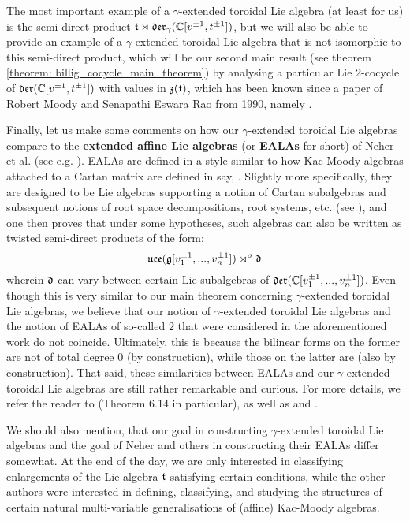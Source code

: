         The most important example of a $\gamma$-extended toroidal Lie algebra (at least for us) is the semi-direct product $\mathfrak{t} \rtimes \mathfrak{der}_{\gamma}(\mathbb{C}[v^{\pm 1}, t^{\pm 1}])$, but we will also be able to provide an example of a $\gamma$-extended toroidal Lie algebra that is not isomorphic to this semi-direct product, which will be our second main result (see theorem \ref{theorem: billig_cocycle_main_theorem}) by analysing a particular Lie $2$-cocycle of $\mathfrak{der}(\mathbb{C}[v^{\pm 1}, t^{\pm 1}])$ with values in $\mathfrak{z}(\mathfrak{t})$, which has been known since a paper of Robert Moody and Senapathi Eswara Rao from 1990, namely \cite{moody_rao_n_toroidal_vertex_representations}.

        Finally, let us make some comments on how our $\gamma$-extended toroidal Lie algebras compare to the \textbf{extended affine Lie algebras} (or \textbf{EALAs} for short) of Neher et al. (see e.g. \cite{neher_lectures_on_EALAs}). EALAs are defined in a style similar to how Kac-Moody algebras attached to a Cartan matrix are defined in say, \cite[Chapters 1 and 2]{kac_infinite_dimensional_lie_algebras}. Slightly more specifically, they are designed to be Lie algebras supporting a notion of Cartan subalgebras and subsequent notions of root space decompositions, root systems, etc. (see \cite[Subsection 2.1]{neher_lectures_on_EALAs}), and one then proves that under some hypotheses, such algebras can also be written as twisted semi-direct products of the form:
            $$\mathfrak{uce}( \mathfrak{g}[v_1^{\pm 1}, ..., v_n^{\pm 1}] ) \rtimes^{\sigma} \mathfrak{d}$$
        wherein $\mathfrak{d}$ can vary between certain Lie subalgebras of $\mathfrak{der}(\mathbb{C}[v_1^{\pm 1}, ..., v_n^{\pm 1}])$. Even though this is very similar to our main theorem concerning $\gamma$-extended toroidal Lie algebras, we believe that our notion of $\gamma$-extended toroidal Lie algebras and the notion of EALAs of so-called  $2$ that were considered in the aforementioned work do not coincide. Ultimately, this is because the bilinear forms on the former are not of total degree $0$ (by construction), while those on the latter are (also by construction). That said, these similarities between EALAs and our $\gamma$-extended toroidal Lie algebras are still rather remarkable and curious. For more details, we refer the reader to \cite[Subsections 6.11, 6.13, and 6.14]{neher_EALA_survey} (Theorem 6.14 in particular), as well as \cite{neher_structure_theory_of_EALAs} and \cite{allison_berman_faulkner_pianzola_multiloop_realisation_of_EALAs}.
        
        We should also mention, that our goal in constructing $\gamma$-extended toroidal Lie algebras and the goal of Neher and others in constructing their EALAs differ somewhat. At the end of the day, we are only interested in classifying enlargements of the Lie algebra $\mathfrak{t}$ satisfying certain conditions, while the other authors were interested in defining, classifying, and studying the structures of certain natural multi-variable generalisations of (affine) Kac-Moody algebras.

